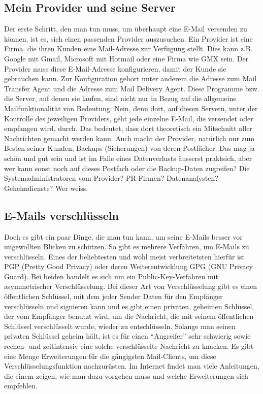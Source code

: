 \subsection{Mein Provider und seine Server}
Der erste Schritt, den man tun muss, um überhaupt eine E-Mail versenden zu können, ist es, sich einen passenden Provider auszusuchen. Ein Provider ist eine Firma, die ihren Kunden eine Mail-Adresse zur Verfügung stellt. Dies kann z.B. Google mit Gmail, Microsoft mit Hotmail oder eine Firma wie GMX sein. Der Provider muss diese E-Mail-Adresse konfigurieren, damit der Kunde sie gebrauchen kann. Zur Konfiguration gehört unter anderem die Adresse zum Mail Transfer Agent und die Adresse zum Mail Delivery Agent.
Diese Programme bzw. die Server, auf denen sie laufen, sind nicht nur in Bezug auf die allgemeine Mailfunktionalität von Bedeutung. Nein, denn dort, auf diesen Servern, unter der Kontrolle des jeweiligen Providers, geht jede einzelne E-Mail, die versendet oder empfangen wird, durch. Das bedeutet, dass dort theoretisch ein Mitschnitt aller Nachrichten gemacht werden kann. Auch macht der Provider, natürlich nur zum Besten seiner Kunden, Backups (Sicherungen) von deren Postfächer. Das mag ja schön und gut sein und ist im Falle eines Datenverlusts äusserst praktsich, aber wer kann sonst noch auf dieses Postfach oder die Backup-Daten zugreifen? Die Systemadministratoren vom Provider? PR-Firmen? Datenanalysten? Geheimdienste? Wer weiss.

\subsection{E-Mails verschlüsseln}
Doch es gibt ein paar Dinge, die man tun kann, um seine E-Mails besser vor ungewollten Blicken zu schützen.
So gibt es mehrere Verfahren, um E-Mails zu verschlüsseln. Eines der beliebtesten und wohl meist verbreitetsten hierfür ist PGP (Pretty Good Privacy) oder deren Weiterentwicklung GPG (GNU Privacy Guard).
Bei beiden handelt es sich um ein Public-Key-Verfahren mit asymmetrischer Verschlüsselung. Bei dieser Art von Verschlüsselung gibt es einen öffentlichen Schlüssel, mit dem jeder Sender Daten für den Empfänger verschlüsseln und signieren kann und es gibt einen privaten, geheimen Schlüssel, der vom Empfänger benutzt wird, um die Nachricht, die mit seinem öffentlichen Schlüssel verschlüsselt wurde, wieder zu entschlüsseln.
Solange man seinen privaten Schlüssel geheim hält, ist es für einen ``Angreifer'' sehr schwierig sowie rechen- und zeitintensiv eine solche verschlüsselte Nachricht zu knacken.
Es gibt eine Menge Erweiterungen für die gängigsten Mail-Clients, um diese Verschlüsselungsfunktion nachzurüsten. Im Internet findet man viele Anleitungen, die einem zeigen, wie man dazu vorgehen muss und welche Erweiterungen sich empfehlen.

